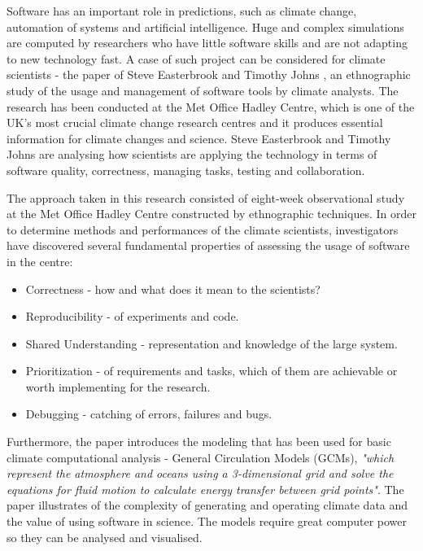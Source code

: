 Software has an important role in predictions, such as climate change, automation of systems and artificial intelligence. \cite{easterbrook2009engineering}\cite{chasmSoftware} Huge and complex simulations are computed by researchers who have little software skills and are not adapting to new technology fast. A case of such project can be considered for climate scientists - the paper of Steve Easterbrook and Timothy Johns \cite{easterbrook2009engineering}, an ethnographic study of the usage and management of software tools by climate analysts. The research has been conducted at the Met Office Hadley Centre, which 
is one of the UK's most crucial climate change research centres and it produces essential information for climate changes and science. \cite{metOffice} Steve Easterbrook and Timothy Johns \cite{easterbrook2009engineering} are analysing how scientists are applying the technology in terms of software quality, correctness, managing tasks, testing and collaboration. 

The approach taken in this research consisted of eight-week observational study at the
Met Office Hadley Centre constructed by ethnographic techniques. In order to determine methods and performances of the climate scientists, investigators have discovered several fundamental properties of assessing the usage of software in the centre:\cite{easterbrook2009engineering}

\begin{itemize}
\item Correctness - how and what does it mean to the scientists? 
\item Reproducibility - of experiments and code. 
\item Shared Understanding - representation and knowledge of the large system. 
\item Prioritization - of requirements and tasks, which of them are achievable or worth implementing for the research. 
\item Debugging - catching of errors, failures and bugs.
\end{itemize}

Furthermore, the paper introduces the modeling that has been used for basic climate computational analysis - General Circulation Models (GCMs), \textit{"which represent the atmosphere and oceans using a 3-dimensional grid and solve the equations for fluid motion to calculate energy transfer between grid points"}. \cite{easterbrook2009engineering} The paper illustrates of the complexity of generating and operating climate data and the value of using software in science. The models require great computer power so they can be analysed and visualised.

